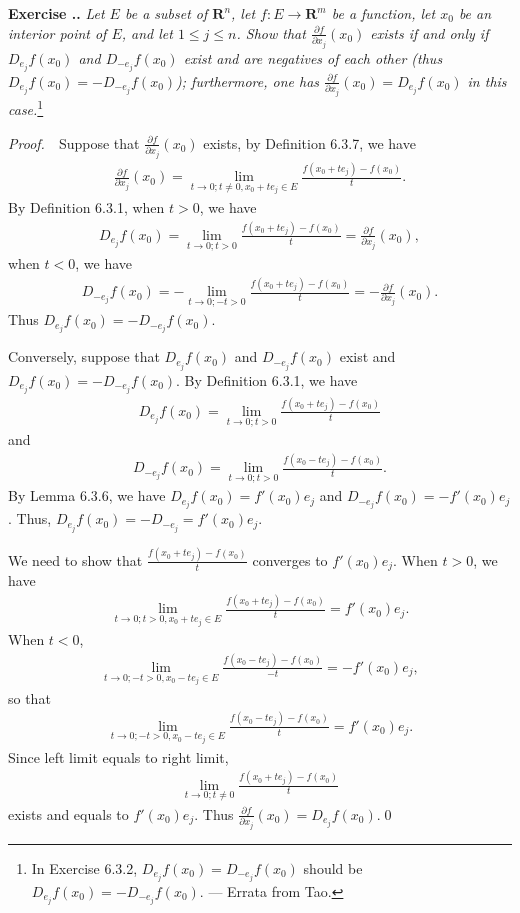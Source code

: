 \documentclass{book}
\newcommand{\pff}{\vspace{.25em}\noindent\emph{Proof.}~~}
\newcounter{Exercise}[section]
\renewcommand{\theExercise}{\thesection.\arabic{Exercise}.}
\newcommand{\new}{\vspace{1.5em}\noindent\textbf{Exercise \stepcounter{Exercise}\textbf{\theExercise}} }
\begin{document}
\new\emph{Let $E$ be a subset of $\mathbf{R}^n$, let $f:E\to\mathbf{R}^m$ be a function, let $x_0$ be an interior point of $E$, and let $1\leq j\leq n$. Show that $\frac{\partial f}{\partial x_j}(x_0)$ exists if and only if $D_{e_j}f(x_0)$ and $D_{-e_j}f(x_0)$ exist and are negatives of each other (thus $D_{e_j}f(x_0)=-D_{-e_j}f(x_0)$); furthermore, one has $\frac{\partial f}{\partial x_j}(x_0)=D_{e_j}f(x_0)$ in this case.}\footnote{In Exercise 6.3.2, $D_{e_j} f(x_0) = D_{-e_j} f(x_0)$ should be $D_{e_j} f(x_0) = -D_{-e_j} f(x_0)$. --- Errata from Tao.}

\pff Suppose that $\frac{\partial f}{\partial x_j}(x_0)$ exists, by Definition 6.3.7, we have
    \begin{align*}
        \frac{\partial f}{\partial x_j}(x_0)=\lim_{t\to 0;t\neq 0,x_0+te_j\in E}\frac{f(x_0+te_j)-f(x_0)}{t}.
    \end{align*}
By Definition 6.3.1, when $t>0$, we have
    \begin{align*}
        D_{e_j}f(x_0)=\lim_{t\to 0;t>0}\frac{f(x_0+te_j)-f(x_0)}{t}=\frac{\partial f}{\partial x_j}(x_0),
    \end{align*}
when $t<0$, we have
    \begin{align*}
        D_{-e_j}f(x_0)=-\lim_{t\to 0;-t>0}\frac{f(x_0+te_j)-f(x_0)}{t}=-\frac{\partial f}{\partial x_j}(x_0).
    \end{align*}
Thus $D_{e_j}f(x_0)=-D_{-e_j}f(x_0)$.

Conversely, suppose that $D_{e_j}f(x_0)$ and $D_{-e_j}f(x_0)$ exist and $D_{e_j}f(x_0)=-D_{-e_j}f(x_0)$. By Definition 6.3.1, we have
    \begin{align*}
        D_{e_j}f(x_0)=\lim_{t\to 0;t>0}\frac{f(x_0+te_j)-f(x_0)}{t}
    \end{align*}
and
    \begin{align*}
        D_{-e_j}f(x_0)=\lim_{t\to 0;t>0}\frac{f(x_0-te_j)-f(x_0)}{t}.
    \end{align*}
By Lemma 6.3.6, we have $D_{e_j}f(x_0)=f'(x_0)e_j$ and $D_{-e_j}f(x_0)=-f'(x_0)e_j$. Thus, $D_{e_j}f(x_0)=-D_{-e_j}=f'(x_0)e_j$.

We need to show that $\frac{f(x_0+te_j)-f(x_0)}{t}$ converges to $f'(x_0)e_j$. When $t>0$, we have
    \begin{align*}
        \lim_{t\to 0;t>0,x_0+te_j\in E}\frac{f(x_0+te_j)-f(x_0)}{t}=f'(x_0)e_j.
    \end{align*}
When $t<0$,
    \begin{align*}
        \lim_{t\to 0;-t>0,x_0-te_j\in E}\frac{f(x_0-te_j)-f(x_0)}{-t}=-f'(x_0)e_j,
    \end{align*}
so that
    \begin{align*}
        \lim_{t\to 0;-t>0,x_0-te_j\in E}\frac{f(x_0-te_j)-f(x_0)}{t}=f'(x_0)e_j.
    \end{align*}
Since left limit equals to right limit,
    \begin{align*}
        \lim_{t \to 0; t \neq 0}\frac{f(x_0 + te_j) - f(x_0)}{t}
    \end{align*}
exists and equals to $f'(x_0) e_j$. Thus $\frac{\partial f}{\partial x_j} (x_0) = D_{e_j} f(x_0)$.\qed
\end{document}
